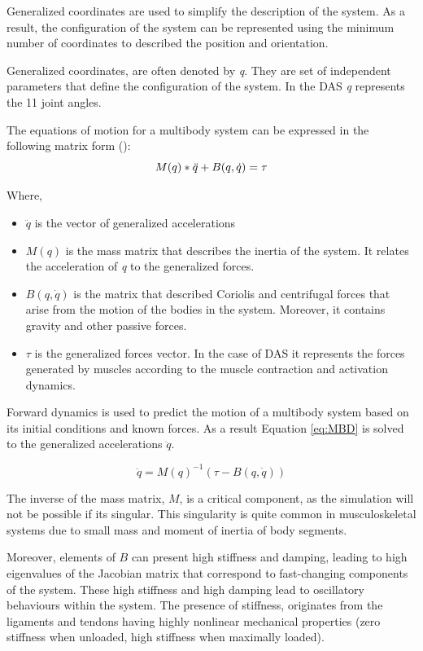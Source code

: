 Generalized coordinates are used to simplify the description of the system. As a result, the configuration of the system can be represented using the minimum number of coordinates to described the position and orientation.  

Generalized coordinates, are often denoted by \textit{q}. They are set of independent parameters that define the configuration of the system. In the DAS \textit{q} represents the 11 joint angles. 

The equations of motion for a multibody system can be expressed in the following matrix form (\cite{Siciliano2009}):
\begin{equation}
    M(q)*\Ddot{q} + B(q,\dot{q}) = \tau
    \label{eq:MBD}
\end{equation}

Where,
\begin{itemize}
    \item $\ddot{q}$ is the vector of generalized accelerations
    \item $M(q)$ is the mass matrix that describes the inertia of the system. It relates the acceleration of \textit{q} to the generalized forces.
    \item $B(q,\dot{q})$ is the matrix that described Coriolis and centrifugal forces that arise from the motion of the bodies in the system. Moreover, it contains gravity and other passive forces.
    \item $\tau$ is the generalized forces vector. In the case of DAS it represents the forces generated by muscles according to the muscle contraction and activation dynamics. 
\end{itemize}

Forward dynamics is used to predict the motion of a multibody system based on its initial conditions and known forces. As a result Equation \ref{eq:MBD} is solved to the generalized accelerations $\ddot{q}$.

\begin{equation}
    \ddot{q} = M(q)^{-1}(\tau - B(q,\dot{q}))
\end{equation}

The inverse of the mass matrix, $M$, is a critical component, as the simulation will not be possible if its singular. This singularity is quite common in musculoskeletal systems due to small mass and moment of inertia of body segments.

Moreover, elements of $B$ can present high stiffness and damping, leading to high eigenvalues of the Jacobian matrix that correspond to fast-changing components of the system. These high stiffness and high damping lead to oscillatory behaviours within the system. The presence of stiffness, originates from the ligaments and tendons having highly nonlinear mechanical properties (zero stiffness when unloaded, high stiffness when maximally loaded).

